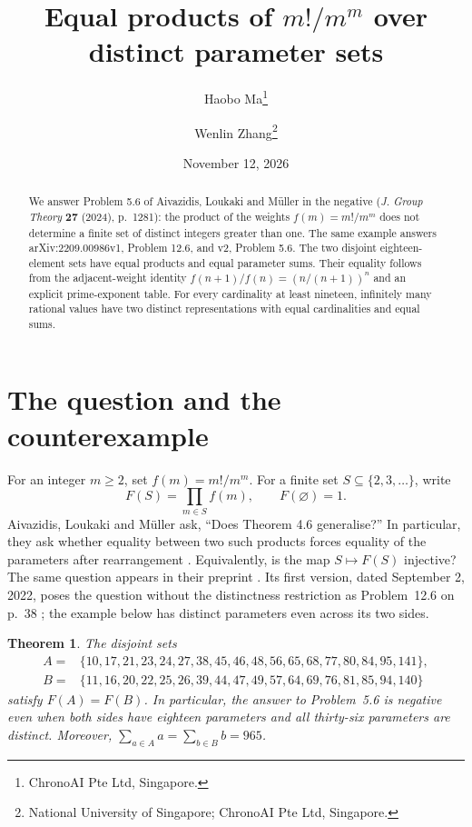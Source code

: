 \documentclass[11pt]{article}
\title{Equal products of $m!/m^m$ over distinct parameter sets}
\author{Haobo Ma\thanks{ChronoAI Pte Ltd, Singapore.}\and
Wenlin Zhang\thanks{National University of Singapore; ChronoAI Pte Ltd, Singapore.}}
\date{November 12, 2026}
\newtheorem{theorem}{Theorem}
\begin{document}
\maketitle
\begin{abstract}
We answer Problem 5.6 of Aivazidis, Loukaki and M\"uller in the negative
(\emph{J. Group Theory} \textbf{27} (2024), p.~1281): the product of the weights $f(m)=m!/m^m$
does not determine a finite set of distinct integers greater than one.
The same example answers arXiv:2209.00986v1, Problem 12.6, and v2, Problem 5.6.
The two disjoint eighteen-element sets have equal products and equal parameter
sums. Their equality follows from the adjacent-weight identity
$f(n+1)/f(n)=(n/(n+1))^n$ and an explicit prime-exponent table.
For every cardinality at least nineteen, infinitely many rational values
have two distinct representations with equal cardinalities and equal sums.
\end{abstract}

\section{The question and the counterexample}
For an integer $m\geq2$, set $f(m)=m!/m^m$. For a finite set
$S\subseteq\{2,3,\ldots\}$, write
\[
 F(S)=\prod_{m\in S}f(m),\qquad F(\varnothing)=1.
\]
Aivazidis, Loukaki and M\"uller ask, ``Does Theorem 4.6 generalise?''
In particular, they ask whether equality between two such products
forces equality of the parameters after rearrangement
\cite[Problem~5.6, p.~1281]{ALM}. Equivalently, is the map $S\mapsto F(S)$
injective? The same question appears in their preprint
\cite[arXiv:2209.00986v2, Problem~5.6, p.~37]{ALMpre}. Its first version, dated September 2,
2022, poses the question without the distinctness restriction as
Problem~12.6 on p.~38 \cite[arXiv:2209.00986v1]{ALMv1}; the example below has distinct
parameters even across its two sides.

\begin{theorem}\label{thm:counterexample}
The disjoint sets
\begin{align*}
 A={}&\{10,17,21,23,24,27,38,45,46,48,56,65,68,77,80,84,95,141\},\\
 B={}&\{11,16,20,22,25,26,39,44,47,49,57,64,69,76,81,85,94,140\}
\end{align*}
satisfy $F(A)=F(B)$. In particular, the answer to Problem~5.6 is negative
even when both sides have eighteen parameters and all thirty-six parameters
are distinct. Moreover, $\sum_{a\in A}a=\sum_{b\in B}b=965$.
\end{theorem}
\end{document}
